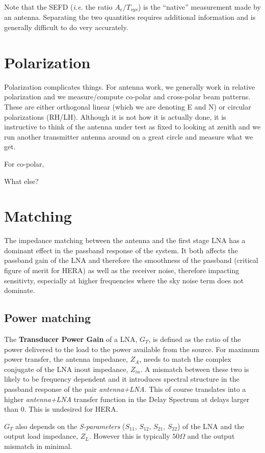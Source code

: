 \documentclass[11pt]{article}
\begin{document}
Note that the SEFD ({\em i.e.} the ratio $A_e/T_{sys}$) is the ``native'' measurement made by an antenna.  Separating the two quantities requires additional information and is generally difficult to do very accurately. 

\section{Polarization}
Polarization complicates things.  For antenna work, we generally work in relative polarization and we measure/compute co-polar and cross-polar beam patterns.  These are either orthogonal linear (which we are denoting E and N) or circular polarizations (RH/LH).
Although it is not how it is actually done, it is instructive to think of the antenna under test as fixed to looking at zenith and we run another transmitter antenna around on a great circle and measure what we get.

For co-polar, 

What else?

\section{Matching}
The impedance matching between the antenna and the first stage LNA has a dominant effect in the passband response of the system. It both affects the passband gain of the LNA and therefore the smoothness of the passband (critical figure of merit for HERA) as well as the receiver noise, therefore impacting sensitivty, especially at higher frequencies where the sky noise term does not dominate.

\subsection{Power matching}
The {\bf Transducer Power Gain} of a LNA, $G_T$, is defined as the ratio of the power delivered to the load to the power available from the source.
For maximum power transfer, the antenna impedance, $Z_A$, needs to match the complex conjugate of the LNA inout impedance, $Z_{in}$. A mismatch between these two is likely to be frequency dependent and it introduces spectral structure in the passband response of the pair {\em antenna+LNA}. This of course translates into a higher {\em antenna+LNA} transfer function in the Delay Spectrum at delays larger than 0. This is undesired for HERA.

$G_T$ also depends on the {\em S-parameters} ($S_{11}$, $S_{12}$, $S_{21}$, $S_{22}$) of the LNA and the output load impedance, $Z_L$. However this is typically $50\Omega$ and the output mismatch in minimal.
\end{document}
